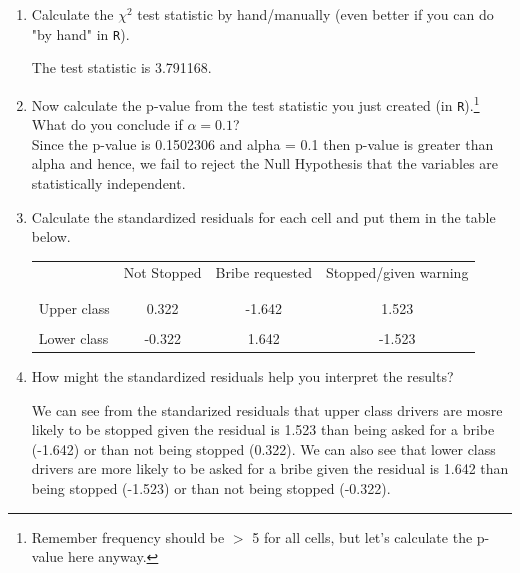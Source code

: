 \documentclass[12pt,letterpaper]{article}
\begin{document}
	\begin{enumerate}
		
		\item [(a)]
		Calculate the $\chi^2$ test statistic by hand/manually (even better if you can do "by hand" in \texttt{R}).\\
		\vspace{0cm}
		
		
		\vspace{1cm} The test statistic is 3.791168.
		\newpage
		\item [(b)]
		Now calculate the p-value from the test statistic you just created (in \texttt{R}).\footnote{Remember frequency should be $>$ 5 for all cells, but let's calculate the p-value here anyway.}  What do you conclude if $\alpha = 0.1$?\\
		
		\vspace{.25cm} Since the p-value is 0.1502306 and alpha = 0.1 then p-value is greater than alpha and hence, we fail to reject the Null Hypothesis that the variables are statistically independent.\\
		
		\item [(c)] Calculate the standardized residuals for each cell and put them in the table below.
		\vspace{0.25cm}
		
		\begin{table}[h]
			\centering
			\begin{tabular}{l | c c c }
				& Not Stopped & Bribe requested & Stopped/given warning \\
				\\[-1.8ex]
				\hline \\[-1.8ex]
				Upper class  & 0.322 & -1.642 & 1.523 \\
				\\
				Lower class & -0.322 & 1.642  & -1.523  \\
				
			\end{tabular}
		\end{table}
		
		\item [(d)] How might the standardized residuals help you interpret the results?  
		

		\vspace{.25cm} We can see from the standarized residuals that upper class drivers are mosre likely to be stopped given the residual is 1.523 than being asked for a bribe (-1.642) or than not being stopped (0.322). We can also see that lower class drivers are more likely to be asked for a bribe given the residual is 1.642 than being stopped (-1.523) or than not being stopped (-0.322).
	\end{enumerate}
	
\end{document}
